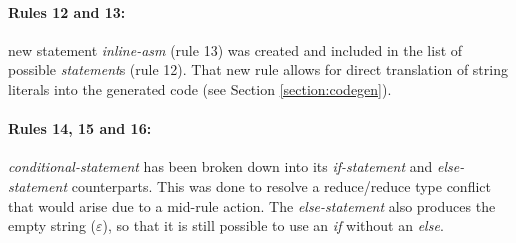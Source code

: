 
\paragraph{Rules 12 and 13:} new statement \textit{inline-asm} (rule 13) was created and
included in the list of possible \textit{statement}s (rule 12). That new rule allows for
direct translation of string literals into the generated code (see Section \ref{section:codegen}).

\paragraph{Rules 14, 15 and 16:} \textit{conditional-statement} has been broken down into its
\textit{if-statement} and \textit{else-statement} counterparts. This was done to resolve a
reduce/reduce type conflict that would arise due to a mid-rule action. The \textit{else-statement}
also produces the empty string ($\varepsilon$), so that it is still possible to use an \textit{if}
without an \textit{else}.



